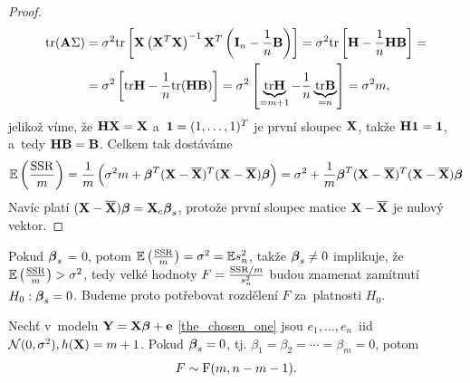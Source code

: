 \begin{proof}
\begin{align*}
\mathrm{tr} (\textbf{A} \Sigma) & = \sigma^2 \mathrm{tr} \left[\mathbf{X} \left(\mathbf{X}^T \mathbf{X} \right)^{-1} \mathbf{X}^T \left(\textbf{I}_{n} - \frac{1}{n} \textbf{B} \right) \right] = \sigma^2 \mathrm{tr}\left[\textbf{H} - \frac{1}{n} \textbf{H} \textbf{B} \right] = \\
& = \sigma^2 \left[\mathrm{tr} \textbf{H} - \frac{1}{n} \mathrm{tr} (\textbf{H} \textbf{B}) \right] = \sigma^2 \left[\underbrace{\mathrm{tr} \textbf{H}}_{ = m+1} - \frac{1}{n} \underbrace{\mathrm{tr} \textbf{B}}_{ = n} \right] = \sigma^2 m,
\end{align*}
jelikož víme, že $\textbf{H} \mathbf{X} = \mathbf{X}$ a~$\mathbf{1} = (1,\dots, 1)^T$ je první sloupec $\mathbf{X}$, takže $\textbf{H} \mathbf{1} = \mathbf{1}$, a~tedy $\textbf{H} \textbf{B} = \textbf{B}$. Celkem tak dostáváme
 $$
\mathbb{E} \left(\frac{\mathrm{SSR}}{m} \right) = \frac{1}{m} \left(\sigma^2 m + \boldsymbol{\beta}^T (\mathbf{X} - \overline{\mathbf{X}})^T(\mathbf{X} - \overline{\mathbf{X}}) \boldsymbol{\beta} \right) = \sigma^2 + \frac{1}{m} \boldsymbol{\beta}^T (\mathbf{X} - \overline{\mathbf{X}})^T(\mathbf{X} - \overline{\mathbf{X}}) \boldsymbol{\beta}
 $$
Navíc platí $(\mathbf{X} - \overline{\mathbf{X}}) \boldsymbol{\beta} = \mathbf{X}_c \boldsymbol{\beta}_s$, protože první sloupec matice $\mathbf{X} - \overline{\mathbf{X}}$ je nulový vektor.
\end{proof}

\begin{remark}
Pokud $\boldsymbol{\beta}_s$ = 0, potom $\mathbb{E} \left(\frac{\mathrm{SSR}}{m} \right) = \sigma^2 = \mathbb{E} s_n^2$, takže $\boldsymbol{\beta}_s \neq 0$ implikuje, že $\mathbb{E} \left(\frac{\mathrm{SSR}}{m} \right) > \sigma^2$, tedy velké hodnoty $F = \frac{\mathrm{SSR}/m}{s_n^2}$ budou znamenat zamítnutí $H_0: \boldsymbol{\beta}_s = 0$. Budeme proto potřebovat rozdělení $F$ za~platnosti $H_0$.
\end{remark}

\begin{theorem}
Nechť v~modelu $\mathbf{Y} = \mathbf{X} \boldsymbol{\beta} + \mathbf{e}$ \eqref{the_chosen_one} jsou $e_1,\dots, e_n $~iid~$\mathcal{N}(0,\sigma^2),h(\mathbf{X}) = m + 1$. Pokud $\boldsymbol{\beta}_s = 0$, tj. $\beta_1 = \beta_2 = \cdots = \beta_m = 0$, potom
 $$
F \sim \mathrm{F}(m, n - m -1).
 $$
\end{theorem}

